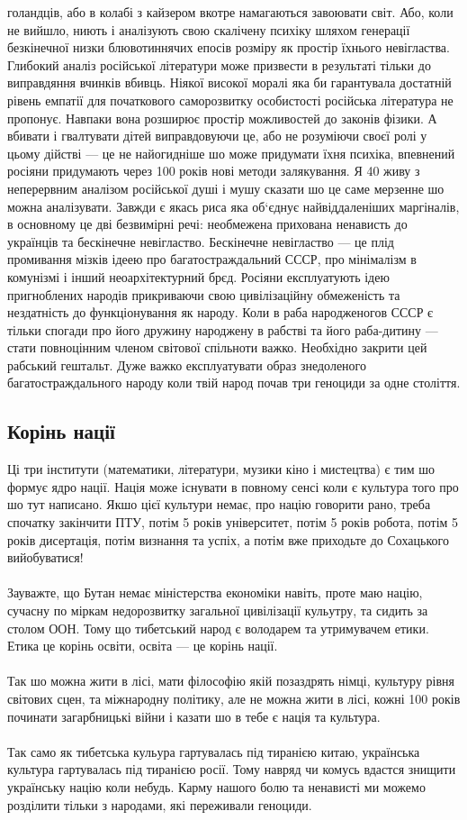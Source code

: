 голандців, або в колабі з кайзером вкотре намагаються завоювати світ.
Або, коли не вийшло, ниють і аналізують свою скалічену психіку шляхом
генерації безкінечної низки блювотиннячих епосів розміру як простір
їхнього невігластва. Глибокий аналіз російської літератури може
призвести в результаті тільки до виправдяння вчинків вбивць. Ніякої
високої моралі яка би гарантувала достатній рівень емпатії для початкового
саморозвитку особистості російська література не пропонує. Навпаки вона
розширює простір можливостей до законів фізики. А вбивати і гвалтувати
дітей виправдовуючи це, або не розуміючи своєї ролі у цьому дійстві — це
не найогидніше шо може придумати їхня психіка, впевнений росіяни придумають
через 100 років нові методи залякування. Я 40 живу з неперервним аналізом
російської душі і мушу сказати шо це саме мерзенне шо можна аналізувати.
Завжди є якась риса яка об‘єднує найвіддаленіших маргіналів, в основному
це дві безвимірні речі: необмежена прихована ненависть до українців та
бескінечне невігластво. Бескінечне невігластво — це плід промивання
мізків ідеею про багатостраждальний СССР, про мінімалізм в комунізмі
і інший неоархітектурний брєд. Росіяни експлуатують ідею пригноблених
народів прикриваючи свою цивілізаційну обмеженість та нездатність до
функціонування як народу. Коли в раба народженогов СССР є тільки спогади
про його дружину народжену в рабстві та його раба-дитину — стати повноцінним
членом світової спільноти важко. Необхідно закрити цей рабський гештальт.
Дуже важко експлуатувати образ знедоленого багатостраждального народу коли
твій народ почав три геноциди за одне століття.

\subsection{Корінь нації}

Ці три інститути (математики, літератури, музики кіно і мистецтва) є тим шо формує ядро нації. Нація може існувати в повному сенсі коли є культура того про шо тут написано. Якшо цієї культури немає, про націю говорити рано, треба спочатку закінчити ПТУ, потім 5 років університет, потім 5 років робота, потім 5 років дисертація, потім визнання та успіх, а потім вже приходьте до Сохацького вийобуватися!
\\
\\
Зауважте, що Бутан немає міністерства економіки навіть, проте маю націю, сучасну по міркам недорозвитку загальної цивілізації кульутру, та сидить за столом ООН. Тому що тибетський народ є володарем та утримувачем етики. Етика це корінь освіти, освіта — це корінь нації.
\\
\\
Так шо можна жити в лісі, мати філософію якій позаздрять німці, культуру рівня світових сцен, та міжнародну політику, але не можна жити в лісі, кожні 100 років починати загарбницькі війни і казати шо в тебе є нація та культура.
\\
\\
Так само як тибетська кульура гартувалась під тиранією китаю, українська культура гартувалась під тиранією росії. Тому навряд чи комусь вдастся знищити українську націю коли небудь. Карму нашого болю та ненависті ми можемо розділити тільки з народами, які переживали геноциди.

\normalsize
